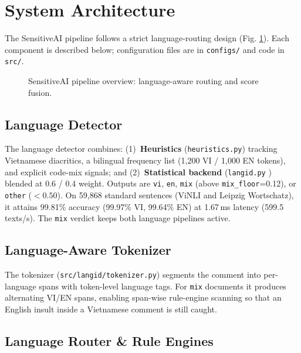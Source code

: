 \section{System Architecture}
\label{sec:architecture}

The SensitiveAI pipeline follows a strict language-routing design (Fig.
\ref{fig:pipeline}).  Each component is described below; configuration files
are in \texttt{configs/} and code in \texttt{src/}.

\begin{figure}[t]
\centering
\resizebox{0.41\textwidth}{!}{}
\caption{SensitiveAI pipeline overview: language-aware routing and score fusion.}
\label{fig:pipeline}
\end{figure}

\subsection{Language Detector}
\label{sec:lang_detector}

The language detector combines: (1)~\textbf{Heuristics} (\texttt{heuristics.py}) tracking Vietnamese diacritics, a bilingual frequency list (1{,}200 VI / 1{,}000 EN tokens), and explicit code-mix signals; and (2)~\textbf{Statistical backend} (\texttt{langid.py} \cite{lui2012langid}) blended at 0.6 / 0.4 weight. Outputs are \texttt{vi}, \texttt{en}, \texttt{mix} (above \texttt{mix\_floor}=0.12), or \texttt{other} ($<0.50$). On 59{,}868 standard sentences (ViNLI and Leipzig Wortschatz), it attains 99.81\% accuracy (99.97\% VI, 99.64\% EN) at 1.67\,ms latency (599.5 texts/s). The \texttt{mix} verdict keeps both language pipelines active.

\subsection{Language-Aware Tokenizer}
\label{sec:tokenizer}

The tokenizer (\texttt{src/langid/tokenizer.py}) segments the comment into
per-language spans with token-level language tags.  For \texttt{mix} documents
it produces alternating VI/EN spans, enabling span-wise rule-engine scanning
so that an English insult inside a Vietnamese comment is still caught.

\subsection{Language Router \& Rule Engines}
\label{sec:router}

